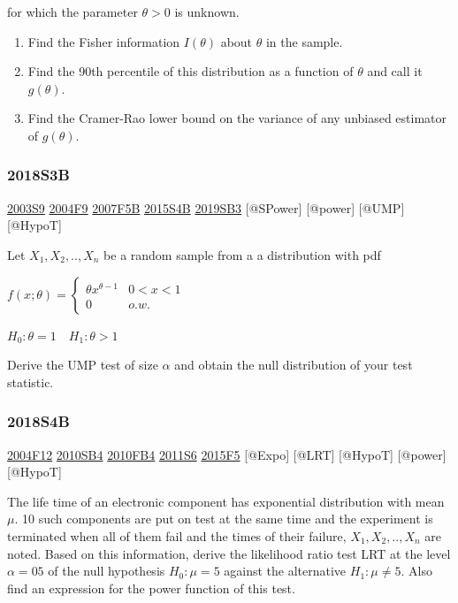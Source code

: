 \documentclass[6pt,Portrait]{article}
\begin{document}
for which the parameter \(\theta>0\) is unknown.

\begin{enumerate}
\def\labelenumi{(\alph{enumi})}
\item
  Find the Fisher information \(I(\theta)\) about \(\theta\) in the
  sample.
\item
  Find the 90th percentile of this distribution as a function of
  \(\theta\) and call it \(g(\theta)\).
\item
  Find the Cramer-Rao lower bound on the variance of any unbiased
  estimator of \(g(\theta)\).
\end{enumerate}

\hypertarget{s3b-2}{%
\subsubsection{2018S3B}\label{s3b-2}}

\protect\hyperlink{s9}{2003S9} \protect\hyperlink{f9-2}{2004F9}
\protect\hyperlink{f5b}{2007F5B} \protect\hyperlink{s4b-1}{2015S4B}
\protect\hyperlink{sb3-3}{2019SB3} {[}@SPower{]} {[}@power{]} {[}@UMP{]}
{[}@HypoT{]}

Let \(X_1,X_2,..,X_n\) be a random sample from a a distribution with pdf

\(f(x;\theta)=\begin{cases}\theta x^{\theta-1}& 0<x<1\\0& o.w.\end{cases}\)

\(H_0:\theta=1\quad H_1 :\theta>1\)

Derive the UMP test of size \(\alpha\) and obtain the null distribution
of your test statistic.

\hypertarget{s4b-2}{%
\subsubsection{2018S4B}\label{s4b-2}}

\protect\hyperlink{f12}{2004F12} \protect\hyperlink{sb4}{2010SB4}
\protect\hyperlink{fb4-1}{2010FB4} \protect\hyperlink{s6-2}{2011S6}
\protect\hyperlink{f5-5}{2015F5} {[}@Expo{]} {[}@LRT{]} {[}@HypoT{]}
{[}@power{]} {[}@HypoT{]}

The life time of an electronic component has exponential distribution
with mean \(\mu\). 10 such components are put on test at the same time
and the experiment is terminated when all of them fail and the times of
their failure, \(X_1,X_2,..,X_n\) are noted. Based on this information,
derive the likelihood ratio test LRT at the level \(\alpha= 05\) of the
null hypothesis \(H_0:\mu=5\) against the alternative \(H_1:\mu\neq5\).
Also find an expression for the power function of this test.
\end{document}
